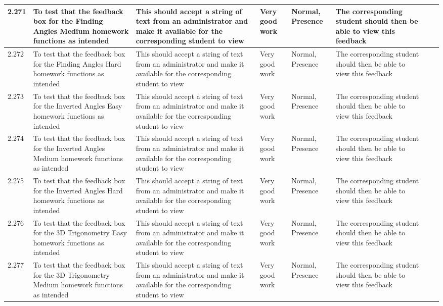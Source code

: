 \begin{landscape}
\begin{center}
\begin{longtable}{|p{1.5cm}|p{2.5cm}|p{2.5cm}|p{2cm}|p{2cm}|p{2cm}|p{2cm}|p{2cm}|}
2.271 & To test that the feedback box for the Finding Angles Medium homework functions as intended & This should accept a string of text from an administrator and make it available for the corresponding student to view & Very good work & Normal, Presence & The corresponding student should then be able to view this feedback & & \\ \hline
2.272 & To test that the feedback box for the Finding Angles Hard homework functions as intended & This should accept a string of text from an administrator and make it available for the corresponding student to view & Very good work & Normal, Presence & The corresponding student should then be able to view this feedback & & \\ \hline
2.273 & To test that the feedback box for the Inverted Angles Easy homework functions as intended & This should accept a string of text from an administrator and make it available for the corresponding student to view & Very good work & Normal, Presence & The corresponding student should then be able to view this feedback & & \\ \hline
2.274 & To test that the feedback box for the Inverted Angles Medium homework functions as intended & This should accept a string of text from an administrator and make it available for the corresponding student to view & Very good work & Normal, Presence & The corresponding student should then be able to view this feedback & & \\ \hline
2.275 & To test that the feedback box for the Inverted Angles Hard homework functions as intended & This should accept a string of text from an administrator and make it available for the corresponding student to view & Very good work & Normal, Presence & The corresponding student should then be able to view this feedback & & \\ \hline
2.276 & To test that the feedback box for the 3D Trigonometry Easy homework functions as intended & This should accept a string of text from an administrator and make it available for the corresponding student to view & Very good work & Normal, Presence & The corresponding student should then be able to view this feedback & & \\ \hline
2.277 & To test that the feedback box for the 3D Trigonometry Medium homework functions as intended & This should accept a string of text from an administrator and make it available for the corresponding student to view & Very good work & Normal, Presence & The corresponding student should then be able to view this feedback & & \\ \hline

\end{longtable}
\end{center}
\end{landscape}

